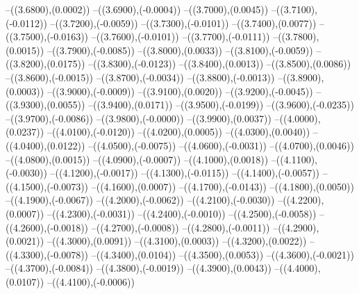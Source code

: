 {	--({\sx*(3.6800)},{\sy*(0.0002)})
	--({\sx*(3.6900)},{\sy*(-0.0004)})
	--({\sx*(3.7000)},{\sy*(0.0045)})
	--({\sx*(3.7100)},{\sy*(-0.0112)})
	--({\sx*(3.7200)},{\sy*(-0.0059)})
	--({\sx*(3.7300)},{\sy*(-0.0101)})
	--({\sx*(3.7400)},{\sy*(0.0077)})
	--({\sx*(3.7500)},{\sy*(-0.0163)})
	--({\sx*(3.7600)},{\sy*(-0.0101)})
	--({\sx*(3.7700)},{\sy*(-0.0111)})
	--({\sx*(3.7800)},{\sy*(0.0015)})
	--({\sx*(3.7900)},{\sy*(-0.0085)})
	--({\sx*(3.8000)},{\sy*(0.0033)})
	--({\sx*(3.8100)},{\sy*(-0.0059)})
	--({\sx*(3.8200)},{\sy*(0.0175)})
	--({\sx*(3.8300)},{\sy*(-0.0123)})
	--({\sx*(3.8400)},{\sy*(0.0013)})
	--({\sx*(3.8500)},{\sy*(0.0086)})
	--({\sx*(3.8600)},{\sy*(-0.0015)})
	--({\sx*(3.8700)},{\sy*(-0.0034)})
	--({\sx*(3.8800)},{\sy*(-0.0013)})
	--({\sx*(3.8900)},{\sy*(0.0003)})
	--({\sx*(3.9000)},{\sy*(-0.0009)})
	--({\sx*(3.9100)},{\sy*(0.0020)})
	--({\sx*(3.9200)},{\sy*(-0.0045)})
	--({\sx*(3.9300)},{\sy*(0.0055)})
	--({\sx*(3.9400)},{\sy*(0.0171)})
	--({\sx*(3.9500)},{\sy*(-0.0199)})
	--({\sx*(3.9600)},{\sy*(-0.0235)})
	--({\sx*(3.9700)},{\sy*(-0.0086)})
	--({\sx*(3.9800)},{\sy*(-0.0000)})
	--({\sx*(3.9900)},{\sy*(0.0037)})
	--({\sx*(4.0000)},{\sy*(0.0237)})
	--({\sx*(4.0100)},{\sy*(-0.0120)})
	--({\sx*(4.0200)},{\sy*(0.0005)})
	--({\sx*(4.0300)},{\sy*(0.0040)})
	--({\sx*(4.0400)},{\sy*(0.0122)})
	--({\sx*(4.0500)},{\sy*(-0.0075)})
	--({\sx*(4.0600)},{\sy*(-0.0031)})
	--({\sx*(4.0700)},{\sy*(0.0046)})
	--({\sx*(4.0800)},{\sy*(0.0015)})
	--({\sx*(4.0900)},{\sy*(-0.0007)})
	--({\sx*(4.1000)},{\sy*(0.0018)})
	--({\sx*(4.1100)},{\sy*(-0.0030)})
	--({\sx*(4.1200)},{\sy*(-0.0017)})
	--({\sx*(4.1300)},{\sy*(-0.0115)})
	--({\sx*(4.1400)},{\sy*(-0.0057)})
	--({\sx*(4.1500)},{\sy*(-0.0073)})
	--({\sx*(4.1600)},{\sy*(0.0007)})
	--({\sx*(4.1700)},{\sy*(-0.0143)})
	--({\sx*(4.1800)},{\sy*(0.0050)})
	--({\sx*(4.1900)},{\sy*(-0.0067)})
	--({\sx*(4.2000)},{\sy*(-0.0062)})
	--({\sx*(4.2100)},{\sy*(-0.0030)})
	--({\sx*(4.2200)},{\sy*(0.0007)})
	--({\sx*(4.2300)},{\sy*(-0.0031)})
	--({\sx*(4.2400)},{\sy*(-0.0010)})
	--({\sx*(4.2500)},{\sy*(-0.0058)})
	--({\sx*(4.2600)},{\sy*(-0.0018)})
	--({\sx*(4.2700)},{\sy*(-0.0008)})
	--({\sx*(4.2800)},{\sy*(-0.0011)})
	--({\sx*(4.2900)},{\sy*(0.0021)})
	--({\sx*(4.3000)},{\sy*(0.0091)})
	--({\sx*(4.3100)},{\sy*(0.0003)})
	--({\sx*(4.3200)},{\sy*(0.0022)})
	--({\sx*(4.3300)},{\sy*(-0.0078)})
	--({\sx*(4.3400)},{\sy*(0.0104)})
	--({\sx*(4.3500)},{\sy*(0.0053)})
	--({\sx*(4.3600)},{\sy*(-0.0021)})
	--({\sx*(4.3700)},{\sy*(-0.0084)})
	--({\sx*(4.3800)},{\sy*(-0.0019)})
	--({\sx*(4.3900)},{\sy*(0.0043)})
	--({\sx*(4.4000)},{\sy*(0.0107)})
	--({\sx*(4.4100)},{\sy*(-0.0006)})
}
